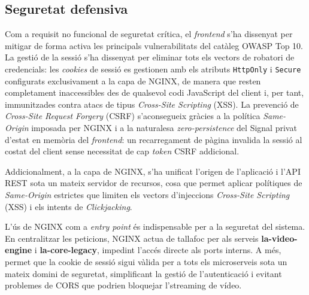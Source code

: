 

\subsection{Seguretat defensiva}
Com a requisit no funcional de seguretat crítica, el \textit{frontend} s'ha dissenyat per mitigar de forma activa les principals vulnerabilitats del catàleg OWASP Top 10. La gestió de la sessió s'ha dissenyat per eliminar tots els vectors de robatori de credencials: les \textit{cookies} de sessió es gestionen amb els atributs \texttt{HttpOnly} i \texttt{Secure} configurats exclusivament a la capa de NGINX, de manera que resten completament inaccessibles des de qualsevol codi JavaScript del client i, per tant, immunitzades contra atacs de tipus \textit{Cross-Site Scripting} (XSS). La prevenció de \textit{Cross-Site Request Forgery} (CSRF) s'aconsegueix gràcies a la política \textit{Same-Origin} imposada per NGINX i a la naturalesa \textit{zero-persistence} del Signal privat d'estat en memòria del \textit{frontend}: un recarregament de pàgina invalida la sessió al costat del client sense necessitat de cap \textit{token} CSRF addicional.

Addicionalment, a la capa de NGINX, s'ha unificat l'origen de l'aplicació i l'API REST sota un mateix servidor de recursos, cosa que permet aplicar polítiques de \textit{Same-Origin} estrictes que limiten els vectors d'injeccions \textit{Cross-Site Scripting} (XSS) i els intents de \textit{Clickjacking}.

L'ús de NGINX com a \textit{entry point} és indispensable per a la seguretat del sistema. En centralitzar les peticions, NGINX actua de tallafoc per als serveis \textbf{la-video-engine} i \textbf{la-core-legacy}, impedint l'accés directe als ports interns. A més, permet que la cookie de sessió sigui vàlida per a tots els microserveis sota un mateix domini de seguretat, simplificant la gestió de l'autenticació i evitant problemes de CORS que podrien bloquejar l'streaming de vídeo.

